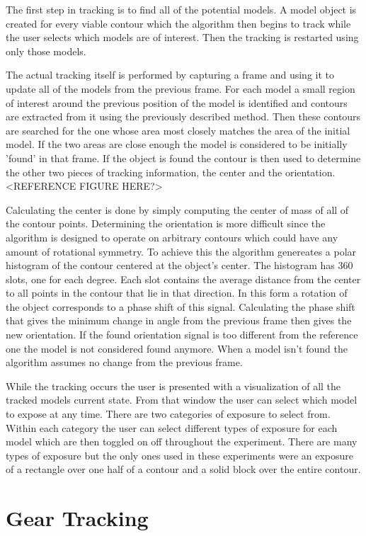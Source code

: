 \documentclass[11pt]{article}
\begin{document}
The first step in tracking is to find all of the potential models. A
model object is created for every viable contour which the algorithm
then begins to track while the user selects which models are of
interest. Then the tracking is restarted using only those models.

The actual tracking itself is performed by capturing a frame and using
it to update all of the models from the previous frame. For each model
a small region of interest around the previous position of the model
is identified and contours are extracted from it using the previously
described method. Then these contours are searched for the one whose
area most closely matches the area of the initial model. If the two
areas are close enough the model is considered to be initially 'found'
in that frame. If the object is found the contour is then used to
determine the other two pieces of tracking information, the center and
the orientation. <REFERENCE FIGURE HERE?>

Calculating the center is done by simply computing the center of mass
of all of the contour points. Determining the orientation is more
difficult since the algorithm is designed to operate on arbitrary
contours which could have any amount of rotational symmetry. To
achieve this the algorithm genereates a polar histogram of the contour
centered at the object's center. The histogram has 360 slots, one for
each degree. Each slot contains the average distance from the center
to all points in the contour that lie in that direction. In this form
a rotation of the object corresponds to a phase shift of this
signal. Calculating the phase shift that gives the minimum change in
angle from the previous frame then gives the new orientation. If the
found orientation signal is too different from the reference one the
model is not considered found anymore. When a model isn't found the
algorithm assumes no change from the previous frame.

While the tracking occurs the user is presented with a visualization
of all the tracked models current state. From that window the user can
select which model to expose at any time. There are two categories of
exposure to select from. Within each category the user can select
different types of exposure for each model which are then toggled on
off throughout the experiment. There are many types of exposure but
the only ones used in these experiments were an exposure of a
rectangle over one half of a contour and a solid block over the entire
contour.

\section{Gear Tracking}
\label{sec:gear-tracking}
\end{document}
